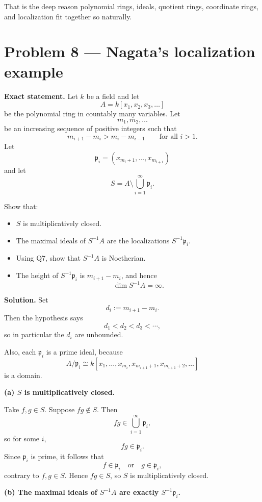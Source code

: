 \documentclass[12pt,a4paper]{article}
\theoremstyle{plain}
\theoremstyle{definition}      %
\begin{document}
	That is the deep reason polynomial rings, ideals, quotient rings, coordinate rings, and localization fit together so naturally.
	
	
	\section*{Problem 8 --- Nagata's localization example}
	
	\textbf{Exact statement.}
	Let \(k\) be a field and let
	\[
	A = k[x_1,x_2,x_3,\dots]
	\]
	be the polynomial ring in countably many variables. Let
	\[
	m_1,m_2,\dots
	\]
	be an increasing sequence of positive integers such that
	\[
	m_{i+1}-m_i > m_i-m_{i-1}\qquad\text{for all }i>1.
	\]
	Let
	\[
	\mathfrak p_i=(x_{m_i+1},\dots,x_{m_{i+1}})
	\]
	and let
	\[
	S=A\setminus \bigcup_{i=1}^{\infty}\mathfrak p_i.
	\]
	
	Show that:
	\begin{itemize}
		\item[(a)] \(S\) is multiplicatively closed.
		\item[(b)] The maximal ideals of \(S^{-1}A\) are the localizations \(S^{-1}\mathfrak p_i\).
		\item[(c)] Using Q7, show that \(S^{-1}A\) is Noetherian.
		\item[(d)] The height of \(S^{-1}\mathfrak p_i\) is \(m_{i+1}-m_i\), and hence
		\[
		\dim S^{-1}A=\infty.
		\]
	\end{itemize}
	
	\textbf{Solution.}
	Set
	\[
	d_i:=m_{i+1}-m_i.
	\]
	Then the hypothesis says
	\[
	d_1<d_2<d_3<\cdots,
	\]
	so in particular the \(d_i\) are unbounded.
	
	Also, each \(\mathfrak p_i\) is a prime ideal, because
	\[
	A/\mathfrak p_i \cong k[x_1,\dots,x_{m_i},x_{m_{i+1}+1},x_{m_{i+1}+2},\dots]
	\]
	is a domain.
	
	\medskip
	
	\textbf{(a) \(S\) is multiplicatively closed.}
	
	Take \(f,g\in S\). Suppose \(fg\notin S\). Then
	\[
	fg\in \bigcup_{i=1}^{\infty}\mathfrak p_i,
	\]
	so for some \(i\),
	\[
	fg\in \mathfrak p_i.
	\]
	Since \(\mathfrak p_i\) is prime, it follows that
	\[
	f\in \mathfrak p_i \quad\text{or}\quad g\in \mathfrak p_i,
	\]
	contrary to \(f,g\in S\). Hence \(fg\in S\), so \(S\) is multiplicatively closed.
	
	\medskip
	
	\textbf{(b) The maximal ideals of \(S^{-1}A\) are exactly \(S^{-1}\mathfrak p_i\).}
	
\end{document}
